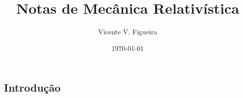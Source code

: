\documentclass[twoside]{amsart}
\title{
Notas de Mecânica Relativística
}
\author{
  Vicente V. Figueira
       }
\date{\today}
\numberwithin{equation}{section}
\begin{document}
\maketitle

\tableofcontents


\begin{refsection}
\section{Introdução}

\printbibliography[heading=subbibliography]
\end{refsection}

\end{document}
